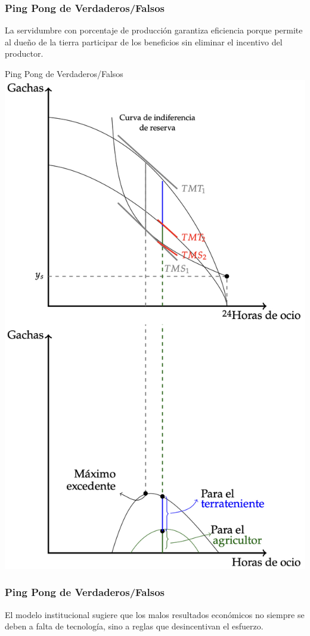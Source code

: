 \documentclass{beamer}
\begin{document}
\begin{frame}
\frametitle{Ping Pong de Verdaderos/Falsos}
    \centering

    La servidumbre con porcentaje de producción garantiza eficiencia porque permite al dueño de la tierra participar de los beneficios sin eliminar el incentivo del productor.

\end{frame}

\begin{frame}{Ping Pong de Verdaderos/Falsos}
    \centering
    \includegraphics[scale=0.28]{../Figures/C19.15.jpg}
\end{frame}

\begin{frame}
\frametitle{Ping Pong de Verdaderos/Falsos}
    \centering
    El modelo institucional sugiere que los malos resultados económicos no siempre se deben a falta de tecnología, sino a reglas que desincentivan el esfuerzo.
\end{frame}
\end{document}
